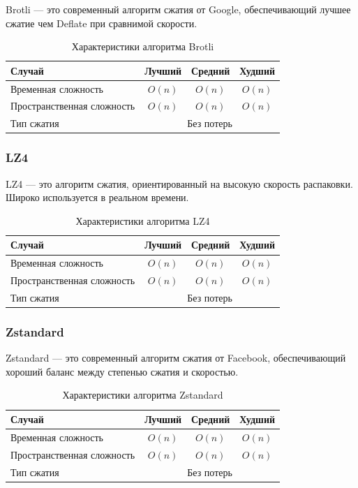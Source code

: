 \documentclass[a4paper,12pt]{article}
\begin{document}
Brotli --- это современный алгоритм сжатия от Google, обеспечивающий лучшее сжатие чем Deflate при сравнимой скорости.

\begin{table}[H]
    \centering
    \begin{tabular}{|l|c|c|c|}
        \hline
        Случай & Лучший & Средний & Худший \\
        \hline
        Временная сложность & $O(n)$ & $O(n)$ & $O(n)$ \\
        \hline
        Пространственная сложность & $O(n)$ & $O(n)$ & $O(n)$ \\
        \hline
        Тип сжатия & \multicolumn{3}{c|}{Без потерь} \\
        \hline
    \end{tabular}
    \caption{Характеристики алгоритма Brotli}
\end{table}

\subsubsection{LZ4}
\label{subsubsec:lz4}

LZ4 --- это алгоритм сжатия, ориентированный на высокую скорость распаковки. Широко используется в реальном времени.

\begin{table}[H]
    \centering
    \begin{tabular}{|l|c|c|c|}
        \hline
        Случай & Лучший & Средний & Худший \\
        \hline
        Временная сложность & $O(n)$ & $O(n)$ & $O(n)$ \\
        \hline
        Пространственная сложность & $O(n)$ & $O(n)$ & $O(n)$ \\
        \hline
        Тип сжатия & \multicolumn{3}{c|}{Без потерь} \\
        \hline
    \end{tabular}
    \caption{Характеристики алгоритма LZ4}
\end{table}

\subsubsection{Zstandard}
\label{subsubsec:zstandard}

Zstandard --- это современный алгоритм сжатия от Facebook, обеспечивающий хороший баланс между степенью сжатия и скоростью.

\begin{table}[H]
    \centering
    \begin{tabular}{|l|c|c|c|}
        \hline
        Случай & Лучший & Средний & Худший \\
        \hline
        Временная сложность & $O(n)$ & $O(n)$ & $O(n)$ \\
        \hline
        Пространственная сложность & $O(n)$ & $O(n)$ & $O(n)$ \\
        \hline
        Тип сжатия & \multicolumn{3}{c|}{Без потерь} \\
        \hline
    \end{tabular}
    \caption{Характеристики алгоритма Zstandard}
\end{table}
\end{document}
